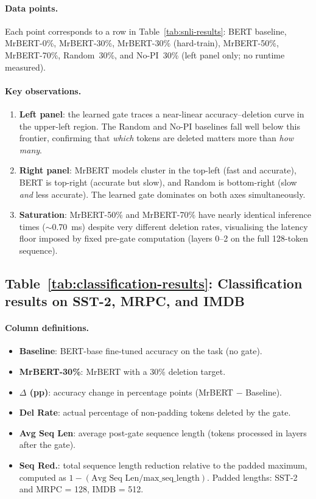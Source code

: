 \documentclass{article} %
\begin{document}
\paragraph{Data points.}
Each point corresponds to a row in Table~\ref{tab:snli-results}: BERT baseline, MrBERT-0\%, MrBERT-30\%, MrBERT-30\% (hard-train), MrBERT-50\%, MrBERT-70\%, Random~30\%, and No-PI~30\% (left panel only; no runtime measured).

\paragraph{Key observations.}
\begin{enumerate}[nosep]
    \item \textbf{Left panel}: the learned gate traces a near-linear accuracy--deletion curve in the upper-left region. The Random and No-PI baselines fall well below this frontier, confirming that \emph{which} tokens are deleted matters more than \emph{how many}.
    \item \textbf{Right panel}: MrBERT models cluster in the top-left (fast and accurate), BERT is top-right (accurate but slow), and Random is bottom-right (slow \emph{and} less accurate). The learned gate dominates on both axes simultaneously.
    \item \textbf{Saturation}: MrBERT-50\% and MrBERT-70\% have nearly identical inference times ($\sim$0.70~ms) despite very different deletion rates, visualising the latency floor imposed by fixed pre-gate computation (layers 0--2 on the full 128-token sequence).
\end{enumerate}

\subsection{Table~\ref{tab:classification-results}: Classification results on SST-2, MRPC, and IMDB}

\paragraph{Column definitions.}
\begin{itemize}[nosep]
    \item \textbf{Baseline}: BERT-base fine-tuned accuracy on the task (no gate).
    \item \textbf{MrBERT-30\%}: MrBERT with a 30\% deletion target.
    \item \textbf{$\Delta$ (pp)}: accuracy change in percentage points (MrBERT $-$ Baseline).
    \item \textbf{Del Rate}: actual percentage of non-padding tokens deleted by the gate.
    \item \textbf{Avg Seq Len}: average post-gate sequence length (tokens processed in layers after the gate).
    \item \textbf{Seq Red.}: total sequence length reduction relative to the padded maximum, computed as $1 - (\text{Avg Seq Len} / \text{max\_seq\_length})$. Padded lengths: SST-2 and MRPC = 128, IMDB = 512.
\end{itemize}
\end{document}
